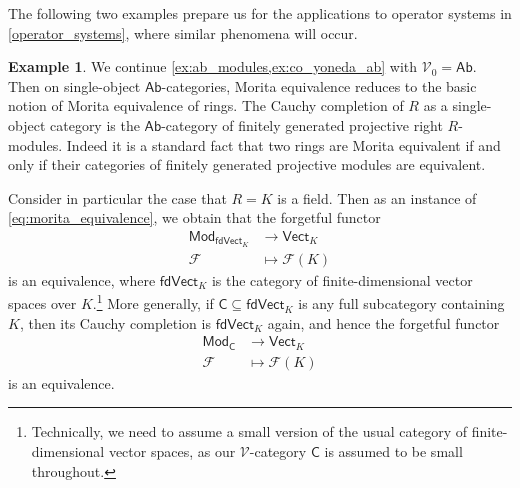 \documentclass[11pt,onecolumn]{article}
\newcommand{\cV}{\mathscr{V}}
\newcommand{\cC}{\mathsf{C}}
\newcommand{\Ab}{\mathsf{Ab}}
\newcommand{\Mod}{\mathsf{Mod}}
\newcommand{\fdVect}{\mathsf{fdVect}}
\newcommand{\Vect}{\mathsf{Vect}}
\theoremstyle{plain}
\theoremstyle{remark}
\theoremstyle{definition}
\newtheorem{example}[example]{Example}
\begin{document}
The following two examples prepare us for the applications to operator systems in \cref{operator_systems}, where similar phenomena will occur.

\begin{example}
	\label{ex:vect_modules}
	We continue \cref{ex:ab_modules,ex:co_yoneda_ab} with $\cV_0 = \Ab$.
	Then on single-object $\Ab$-categories, Morita equivalence reduces to the basic notion of Morita equivalence of rings.
	The Cauchy completion of $R$ as a single-object category is the $\Ab$-category of finitely generated projective right $R$-modules.
	Indeed it is a standard fact that two rings are Morita equivalent if and only if their categories of finitely generated projective modules are equivalent.


	Consider in particular the case that $R = K$ is a field.
	Then as an instance of \eqref{eq:morita_equivalence}, we obtain that the forgetful functor
	\begin{align*}
		\Mod_{\fdVect_K} & \longrightarrow \Vect_K \\[2pt]
		\mathcal{F} & \longmapsto \mathcal{F}(K)
	\end{align*}
	is an equivalence, where $\fdVect_K$ is the category of finite-dimensional vector spaces over $K$.\footnote{Technically, we need to assume a small version of the usual category of finite-dimensional vector spaces, as our $\cV$-category $\cC$ is assumed to be small throughout.}
	More generally, if $\cC \subseteq \fdVect_K$ is any full subcategory containing $K$, then its Cauchy completion is $\fdVect_K$ again,
	and hence the forgetful functor
	\begin{align*}
		\Mod_\cC & \longrightarrow \Vect_K \\[2pt]
		\mathcal{F} & \longmapsto \mathcal{F}(K)
	\end{align*}
	is an equivalence.
\end{example}
\end{document}

